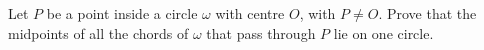 Let $P$ be a point inside a circle $\omega$ with centre $O$, with $P\ne O$. Prove that the midpoints of all the chords of $\omega$ that pass through $P$ lie on one circle.
